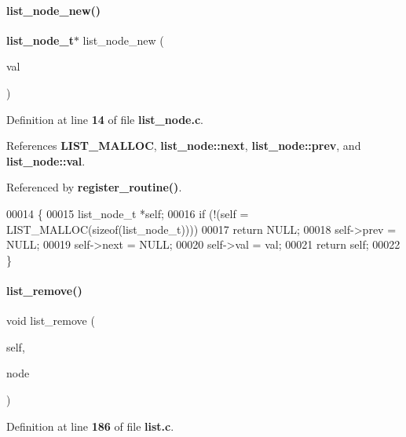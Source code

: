 \paragraph{list\+\_\+node\+\_\+new()}
{\footnotesize\ttfamily \textbf{ list\+\_\+node\+\_\+t}$\ast$ list\+\_\+node\+\_\+new (\begin{DoxyParamCaption}\item[{void $\ast$}]{val }\end{DoxyParamCaption})}



Definition at line \textbf{ 14} of file \textbf{ list\+\_\+node.\+c}.



References \textbf{ L\+I\+S\+T\+\_\+\+M\+A\+L\+L\+OC}, \textbf{ list\+\_\+node\+::next}, \textbf{ list\+\_\+node\+::prev}, and \textbf{ list\+\_\+node\+::val}.



Referenced by \textbf{ register\+\_\+routine()}.


\begin{DoxyCode}
00014                                       \{
00015   list_node_t *\textcolor{keyword}{self};
00016   \textcolor{keywordflow}{if} (!(\textcolor{keyword}{self} = LIST_MALLOC(\textcolor{keyword}{sizeof}(list_node_t))))
00017     \textcolor{keywordflow}{return} NULL;
00018   \textcolor{keyword}{self}->prev = NULL;
00019   \textcolor{keyword}{self}->next = NULL;
00020   \textcolor{keyword}{self}->val = val;
00021   \textcolor{keywordflow}{return} \textcolor{keyword}{self};
00022 \}
\end{DoxyCode}
\mbox{\label{a00029_a5ef7843a8a481124bce3e93541ba379a}} 
\paragraph{list\+\_\+remove()}
{\footnotesize\ttfamily void list\+\_\+remove (\begin{DoxyParamCaption}\item[{\textbf{ list\+\_\+t} $\ast$}]{self,  }\item[{\textbf{ list\+\_\+node\+\_\+t} $\ast$}]{node }\end{DoxyParamCaption})}



Definition at line \textbf{ 186} of file \textbf{ list.\+c}.




